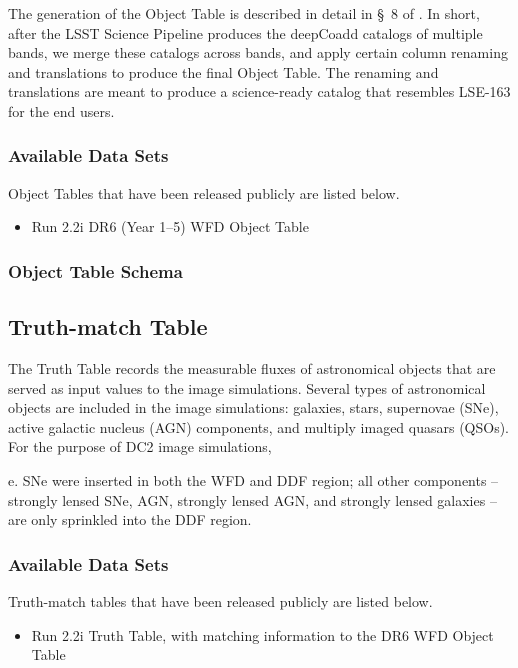 \documentclass[11pt]{report}
\begin{document}
The generation of the Object Table is described in detail in \S~8 of \cite{2020arXiv201005926L}. In short, after the LSST Science Pipeline produces the deepCoadd catalogs of multiple bands, we merge these catalogs across bands, and apply certain column renaming and translations to produce the final Object Table. The renaming and translations are meant to produce a science-ready catalog that resembles LSE-163 for the end users. 

\subsubsection{Available Data Sets}

Object Tables that have been released publicly are listed below.

\begin{itemize}
  \item Run 2.2i DR6 (Year 1--5) WFD Object Table
\end{itemize}

\subsubsection{Object Table Schema}



\subsection{Truth-match Table}
\label{sec:truth}

The Truth Table records the measurable fluxes of astronomical objects that are served as input values to the image simulations. Several types of astronomical objects are included in the image simulations: galaxies, stars, supernovae (SNe), active galactic nucleus (AGN) components, and multiply imaged quasars (QSOs). For the purpose of DC2 image simulations, 

e. SNe were inserted in both the WFD and DDF
region; all other components – strongly lensed SNe, AGN,
strongly lensed AGN, and strongly lensed galaxies – are only
sprinkled into the DDF region.

\subsubsection{Available Data Sets}

Truth-match tables that have been released publicly are listed below.

\begin{itemize}
  \item Run 2.2i Truth Table, with matching information to the DR6 WFD Object Table
\end{itemize}
\end{document}
